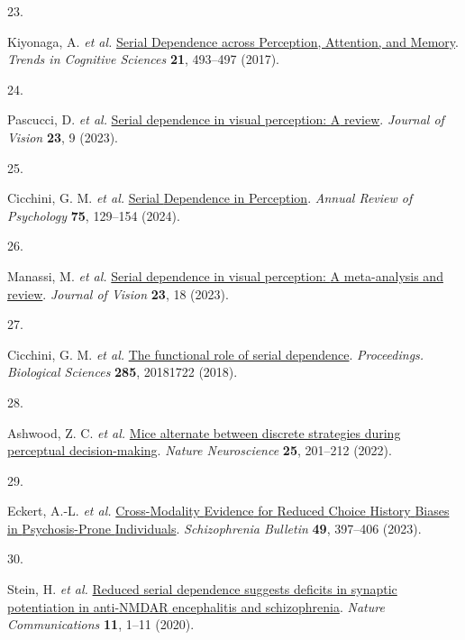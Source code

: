 \documentclass[
]{article}
\newlength{\cslhangindent}
\newlength{\csllabelwidth}
\newlength{\cslentryspacingunit} %
\newenvironment{CSLReferences}[2] %
 {%
  \setlength{\parindent}{0pt}
  \ifodd #1
  \let\oldpar\par
  \def\par{\hangindent=\cslhangindent\oldpar}
  \fi
  \setlength{\parskip}{#2\cslentryspacingunit}
 }%
 {}
\newcommand{\CSLLeftMargin}[1]{\parbox[t]{\csllabelwidth}{#1}}
\newcommand{\CSLRightInline}[1]{\parbox[t]{\linewidth - \csllabelwidth}{#1}\break}
\begin{document}
\begin{CSLReferences}{0}{0}
\leavevmode{}%
\CSLLeftMargin{23. }%
\CSLRightInline{Kiyonaga, A. \emph{et al.}
\href{https://doi.org/10.1016/j.tics.2017.04.011}{Serial {Dependence}
across {Perception}, {Attention}, and {Memory}}. \emph{Trends in
Cognitive Sciences} \textbf{21}, 493--497 (2017).}

\leavevmode{}%
\CSLLeftMargin{24. }%
\CSLRightInline{Pascucci, D. \emph{et al.}
\href{https://doi.org/10.1167/jov.23.1.9}{Serial dependence in visual
perception: {A} review}. \emph{Journal of Vision} \textbf{23}, 9
(2023).}

\leavevmode{}%
\CSLLeftMargin{25. }%
\CSLRightInline{Cicchini, G. M. \emph{et al.}
\href{https://doi.org/10.1146/annurev-psych-021523-104939}{Serial
{Dependence} in {Perception}}. \emph{Annual Review of Psychology}
\textbf{75}, 129--154 (2024).}

\leavevmode{}%
\CSLLeftMargin{26. }%
\CSLRightInline{Manassi, M. \emph{et al.}
\href{https://doi.org/10.1167/jov.23.8.18}{Serial dependence in visual
perception: {A} meta-analysis and review}. \emph{Journal of Vision}
\textbf{23}, 18 (2023).}

\leavevmode{}%
\CSLLeftMargin{27. }%
\CSLRightInline{Cicchini, G. M. \emph{et al.}
\href{https://doi.org/10.1098/rspb.2018.1722}{The functional role of
serial dependence}. \emph{Proceedings. Biological Sciences}
\textbf{285}, 20181722 (2018).}

\leavevmode{}%
\CSLLeftMargin{28. }%
\CSLRightInline{Ashwood, Z. C. \emph{et al.}
\href{https://doi.org/10.1038/s41593-021-01007-z}{Mice alternate between
discrete strategies during perceptual decision-making}. \emph{Nature
Neuroscience} \textbf{25}, 201--212 (2022).}

\leavevmode{}%
\CSLLeftMargin{29. }%
\CSLRightInline{Eckert, A.-L. \emph{et al.}
\href{https://doi.org/10.1093/schbul/sbac168}{Cross-{Modality}
{Evidence} for {Reduced} {Choice} {History} {Biases} in
{Psychosis}-{Prone} {Individuals}}. \emph{Schizophrenia Bulletin}
\textbf{49}, 397--406 (2023).}

\leavevmode{}%
\CSLLeftMargin{30. }%
\CSLRightInline{Stein, H. \emph{et al.}
\href{https://doi.org/10.1038/s41467-020-18033-3}{Reduced serial
dependence suggests deficits in synaptic potentiation in anti-{NMDAR}
encephalitis and schizophrenia}. \emph{Nature Communications}
\textbf{11}, 1--11 (2020).}

\end{CSLReferences}
\end{document}
